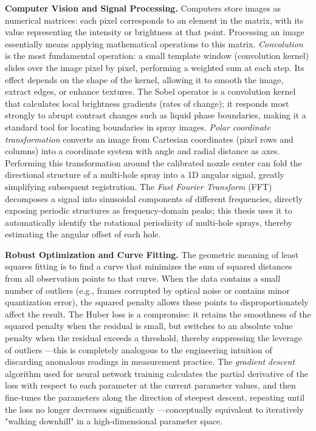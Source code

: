 \documentclass[english, 12pt, a4paper, elec, utf8, a-2b, online]{aaltothesis}
\begin{document}
\textbf{Computer Vision and Signal Processing.}
Computers store images as numerical matrices: 
each pixel corresponds to an element in the matrix, 
with its value representing the intensity or brightness at that point. 
Processing an image essentially means applying mathematical operations to this matrix. 
\emph{Convolution} is the most fundamental operation: 
a small template window (convolution kernel) slides over the image pixel by pixel, 
performing a weighted sum at each step. 
Its effect depends on the shape of the kernel, 
allowing it to smooth the image, extract edges, or enhance textures. 
The Sobel operator is a convolution kernel that calculates local brightness gradients 
(rates of change); 
it responds most strongly to abrupt contrast changes such as liquid phase boundaries, 
making it a standard tool for locating boundaries in spray images. 
\emph{Polar coordinate transformation} converts an image from Cartesian coordinates 
(pixel rows and columns) into a coordinate system with angle and radial distance as axes. 
Performing this transformation around the calibrated nozzle center 
can fold the directional structure of a multi-hole spray into a 1D angular signal, 
greatly simplifying subsequent registration. 
The \emph{Fast Fourier Transform} (FFT) decomposes a signal into sinusoidal components 
of different frequencies, 
directly exposing periodic structures as frequency-domain peaks; 
this thesis uses it to automatically identify the rotational periodicity of multi-hole sprays, 
thereby estimating the angular offset of each hole.

\textbf{Robust Optimization and Curve Fitting.}
The geometric meaning of least squares fitting is to find a curve that minimizes 
the sum of squared distances from all observation points to that curve. 
When the data contains a small number of outliers 
(e.g., frames corrupted by optical noise or contains minor quantization error), 
the squared penalty allows these points to disproportionately affect the result. 
The Huber loss is a compromise: 
it retains the smoothness of the squared penalty when the residual is small, 
but switches to an absolute value penalty when the residual exceeds a threshold, 
thereby suppressing the leverage of outliers
---this is completely analogous to the engineering intuition of discarding anomalous readings 
in measurement practice. 
The \emph{gradient descent} algorithm used for neural network training calculates 
the partial derivative of the loss with respect to each parameter at the current parameter values, 
and then fine-tunes the parameters along the direction of steepest descent, 
repeating until the loss no longer decreases significantly
---conceptually equivalent to iteratively "walking downhill" in a high-dimensional parameter space.
\end{document}
